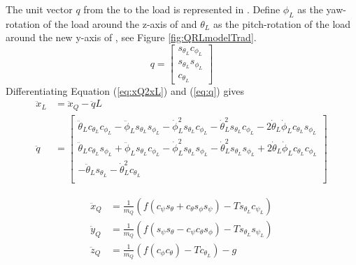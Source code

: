 The unit vector $ q $ from the  to the load is represented in \BF. Define $ \phi_L $ as the yaw-rotation of the load around the z-axis of \BF and $ \theta_L $ as the pitch-rotation of the load around the new y-axis of \BF, see Figure \ref{fig:QRLmodelTrad}.
\begin{equation}\label{eq:q}
q=\begin{bmatrix}
s_{\theta_L}c_{\phi_L}\\
s_{\theta_L}s_{\phi_L}\\
c_{\theta_L}
\end{bmatrix}
\end{equation}  
Differentiating Equation (\ref{eq:xQ2xL}) and (\ref{eq:q}) gives
\begin{equation}\label{key}
\begin{aligned}
\ddot{x}_L&=\ddot{x}_Q-\ddot{q}L\\
\ddot{q}&=\begin{bmatrix}
\ddot{\theta}_Lc_{\theta_L}c_{\phi_L}-\ddot{\phi}_Ls_{\theta_L}s_{\phi_L}-\dot{\phi}_L^2s_{\theta_L}c_{\phi_L}-\dot{\theta}_L^2s_{\theta_L}c_{\phi_L}-2\dot{\theta}_L\dot{\phi}_Lc_{\theta_L}s_{\phi_L}\\
\ddot{\theta}_Lc_{\theta_L}s_{\phi_L}+\ddot{\phi}_Ls_{\theta_L}c_{\phi_L}-\dot{\phi}_L^2s_{\theta_L}s_{\phi_L}-\dot{\theta}_L^2s_{\theta_L}s_{\phi_L}+2\dot{\theta}_L\dot{\phi}_Lc_{\theta_L}c_{\phi_L}\\
-\ddot{\theta}_Ls_{\theta_L}-\dot{\theta}_L^2 c_{\theta_L}\\
\end{bmatrix}
\end{aligned}
\end{equation}




\begin{equation}\label{key}
\begin{aligned}
\ddot{x}_Q&=\frac{1}{m_Q}(f(c_{\psi}s_{\theta}+c_{\theta}s_{\phi}s_{\psi})-Ts_{\theta_L}c_{\psi_L})\\
\ddot{y}_Q&=\frac{1}{m_Q}(f(s_{\psi}s_{\theta}-c_{\psi}c_{\theta}s_{\phi})-Ts_{\theta_L}s_{\psi_L})\\
\ddot{z}_Q&=\frac{1}{m_Q}(f(c_{\phi}c_{\theta})-Tc_{\theta_L})-g\\
\end{aligned}
\end{equation}

